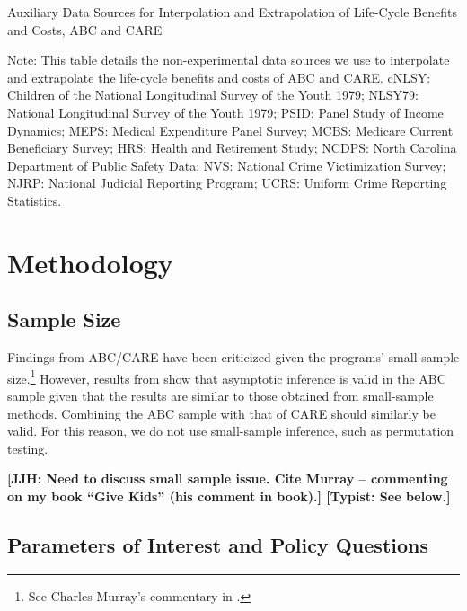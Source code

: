 \begin{table}[H]
\begin{threeparttable}
\caption{Auxiliary Data Sources for Interpolation and Extrapolation of Life-Cycle Benefits and Costs, ABC and CARE} \label{table:sources}
\footnotesize

\begin{tablenotes}
\footnotesize
Note: This table details the non-experimental data sources we use to interpolate and extrapolate the life-cycle benefits and costs of ABC and CARE. cNLSY: Children of the National Longitudinal Survey of the Youth 1979; NLSY79: National Longitudinal Survey of the Youth 1979; PSID: Panel Study of Income Dynamics; MEPS: Medical Expenditure Panel Survey; MCBS: Medicare Current Beneficiary Survey; HRS: Health and Retirement Study; NCDPS: North Carolina Department of Public Safety Data; NVS: National Crime Victimization Survey; NJRP: National Judicial Reporting Program; UCRS: Uniform Crime Reporting Statistics.
\end{tablenotes}
\end{threeparttable}
\end{table}

\section{Methodology} \label{section:methodology}

\subsection{Sample Size}

Findings from ABC/CARE have been criticized given the programs' small sample size.\footnote{See Charles Murray's commentary in \citep
{Heckman_2013_BOOKGivingkidsfair}.} However, results from \citet{Campbell_Conti_etal_2014_EarlyChildhoodInvestments} show that asymptotic inference is valid in the ABC sample given that the results are similar to those obtained from small-sample methods. Combining the ABC sample with that of CARE should similarly be valid. For this reason, we do not use small-sample inference, such as permutation testing.

\textbf{[JJH: Need to discuss small sample issue. Cite Murray -- commenting on my book ``Give Kids'' (his comment in book).] [Typist: See below.]}

\subsection{Parameters of Interest and Policy Questions} \label{section:methodsquestions}

